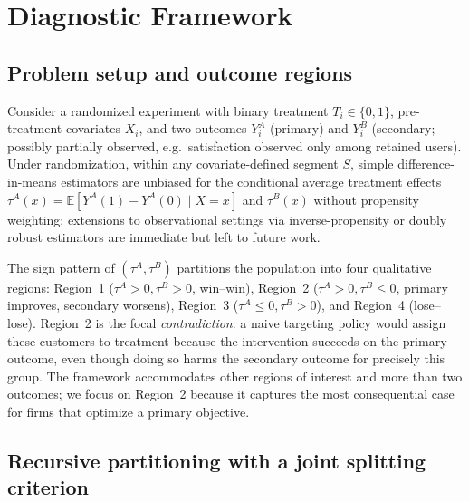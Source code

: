 \documentclass[12pt,a4paper]{article}
\begin{document}
\section{Diagnostic Framework}
\label{sec:framework}

\subsection{Problem setup and outcome regions}

Consider a randomized experiment with binary treatment $T_i\in\{0,1\}$, pre-treatment covariates $X_i$, and two outcomes $Y_i^A$ (primary) and $Y_i^B$ (secondary; possibly partially observed, e.g.\ satisfaction observed only among retained users). Under randomization, within any covariate-defined segment $S$, simple difference-in-means estimators are unbiased for the conditional average treatment effects $\tau^A(x)=\mathbb{E}[Y^A(1)-Y^A(0)\mid X=x]$ and $\tau^B(x)$ without propensity weighting; extensions to observational settings via inverse-propensity or doubly robust estimators are immediate but left to future work.

The sign pattern of $(\tau^A,\tau^B)$ partitions the population into four qualitative regions: Region~1 ($\tau^A>0,\tau^B>0$, win--win), Region~2 ($\tau^A>0,\tau^B\le 0$, primary improves, secondary worsens), Region~3 ($\tau^A\le 0,\tau^B>0$), and Region~4 (lose--lose). Region~2 is the focal \emph{contradiction}: a naive targeting policy would assign these customers to treatment because the intervention succeeds on the primary outcome, even though doing so harms the secondary outcome for precisely this group. The framework accommodates other regions of interest and more than two outcomes; we focus on Region~2 because it captures the most consequential case for firms that optimize a primary objective.

\subsection{Recursive partitioning with a joint splitting criterion}
\end{document}
